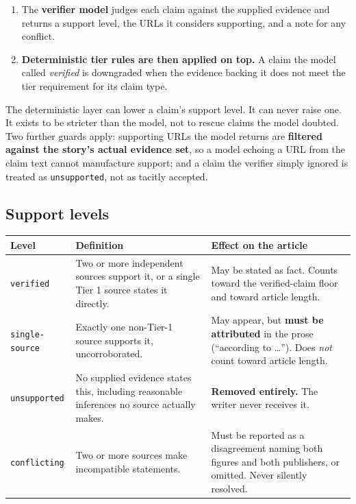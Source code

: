 \documentclass[11pt,a4paper]{article}
\newcommand{\brk}{\hyphenpenalty=0\exhyphenpenalty=0\relax}
\newcommand{\code}[1]{\texttt{\small\brk #1}}
\begin{document}
\begin{enumerate}[leftmargin=1.4em,itemsep=0.3em]
  \item The \textbf{verifier model} judges each claim against the supplied
    evidence and returns a support level, the URLs it considers supporting, and a
    note for any conflict.
  \item \textbf{Deterministic tier rules are then applied on top.} A claim the
    model called \emph{verified} is downgraded when the evidence backing it does
    not meet the tier requirement for its claim type.
\end{enumerate}

\begin{blockbox}
The deterministic layer can lower a claim's support level. It can never raise
one. It exists to be stricter than the model, not to rescue claims the model
doubted. Two further guards apply: supporting URLs the model returns are
\textbf{filtered against the story's actual evidence set}, so a model echoing a
URL from the claim text cannot manufacture support; and a claim the verifier
simply ignored is treated as \code{unsupported}, not as tacitly accepted.
\end{blockbox}

\subsection{Support levels}

\begin{center}
\small
\begin{tabularx}{\textwidth}{@{}l >{\RaggedRight}X >{\RaggedRight}p{4.3cm}@{}}
\toprule
\textbf{Level} & \textbf{Definition} & \textbf{Effect on the article} \\
\midrule
\code{verified} & Two or more independent sources support it, or a single Tier 1
  source states it directly. & May be stated as fact. Counts toward the
  verified-claim floor and toward article length. \\
\code{single-source} & Exactly one non-Tier-1 source supports it, uncorroborated. &
  May appear, but \textbf{must be attributed} in the prose (``according to
  \ldots''). Does \emph{not} count toward article length. \\
\code{unsupported} & No supplied evidence states this, including reasonable
  inferences no source actually makes. & \textbf{Removed entirely.} The writer
  never receives it. \\
\code{conflicting} & Two or more sources make incompatible statements. & Must be
  reported as a disagreement naming both figures and both publishers, or omitted.
  Never silently resolved. \\
\bottomrule
\end{tabularx}
\end{center}
\end{document}
